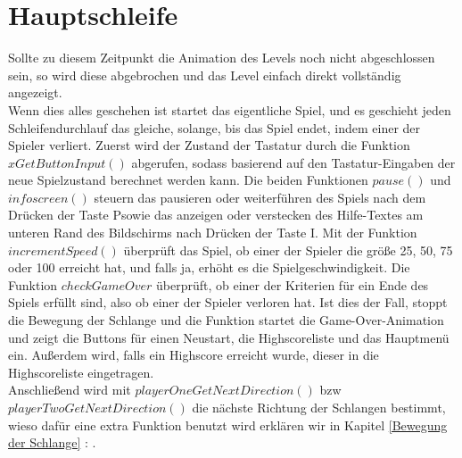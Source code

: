 \section{Hauptschleife}
\label{Hauptschleife}
%
Sollte zu diesem Zeitpunkt die Animation des Levels noch nicht abgeschlossen sein, so wird diese abgebrochen und das Level einfach direkt vollständig angezeigt. \\
Wenn dies alles geschehen ist startet das eigentliche Spiel, und es geschieht jeden Schleifendurchlauf das gleiche, solange, bis das Spiel endet, indem einer der Spieler verliert.
Zuerst wird der Zustand der Tastatur durch die Funktion $xGetButtonInput()$ abgerufen, sodass basierend auf den Tastatur-Eingaben der neue Spielzustand berechnet werden kann. Die beiden Funktionen $pause()$ und $infoscreen()$ steuern das pausieren oder weiterführen des Spiels nach dem Drücken der Taste \glqq P\grqq sowie das anzeigen oder verstecken des Hilfe-Textes am unteren Rand des Bildschirms nach Drücken der Taste \glqq I\grqq. Mit der Funktion $incrementSpeed()$ überprüft das Spiel, ob einer der Spieler die größe 25, 50, 75 oder 100 erreicht hat, und falls ja, erhöht es die Spielgeschwindigkeit. Die Funktion $checkGameOver$ überprüft, ob einer der Kriterien für ein Ende des Spiels erfüllt sind, also ob einer der Spieler verloren hat. Ist dies der Fall, stoppt die Bewegung der Schlange und die Funktion startet die Game-Over-Animation und zeigt die Buttons für einen Neustart, die Highscoreliste und das Hauptmenü ein. Außerdem wird, falls ein Highscore erreicht wurde, dieser in die Highscoreliste eingetragen.\\
Anschließend wird mit $playerOneGetNextDirection()$ bzw $playerTwoGetNextDirection()$ die nächste Richtung der Schlangen bestimmt, wieso dafür eine extra Funktion benutzt wird erklären wir in Kapitel \ref{Bewegung der Schlange}  : . \\
